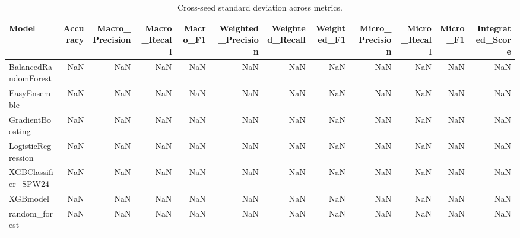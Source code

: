 \begin{table}[t]
\centering
\begin{tabular}{lrrrrrrrrrrr}
\toprule
Model & Accuracy & Macro_Precision & Macro_Recall & Macro_F1 & Weighted_Precision & Weighted_Recall & Weighted_F1 & Micro_Precision & Micro_Recall & Micro_F1 & Integrated_Score \\
\midrule
BalancedRandomForest & NaN & NaN & NaN & NaN & NaN & NaN & NaN & NaN & NaN & NaN & NaN \\
EasyEnsemble & NaN & NaN & NaN & NaN & NaN & NaN & NaN & NaN & NaN & NaN & NaN \\
GradientBoosting & NaN & NaN & NaN & NaN & NaN & NaN & NaN & NaN & NaN & NaN & NaN \\
LogisticRegression & NaN & NaN & NaN & NaN & NaN & NaN & NaN & NaN & NaN & NaN & NaN \\
XGBClassifier_SPW24 & NaN & NaN & NaN & NaN & NaN & NaN & NaN & NaN & NaN & NaN & NaN \\
XGBmodel & NaN & NaN & NaN & NaN & NaN & NaN & NaN & NaN & NaN & NaN & NaN \\
random_forest & NaN & NaN & NaN & NaN & NaN & NaN & NaN & NaN & NaN & NaN & NaN \\
\bottomrule
\end{tabular}
\caption{Cross-seed standard deviation across metrics.}
\label{tab:cross_seed_std}
\end{table}